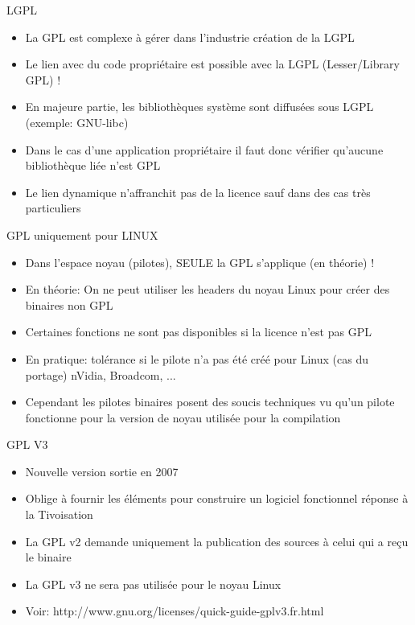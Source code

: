 \begin{frame}{LGPL}{}
  \begin{itemize}
  \item La GPL est complexe à gérer dans l'industrie \MVRightarrow{} création de la LGPL
  \item Le lien avec du code propriétaire est possible avec la LGPL (Lesser/Library GPL) !
  \item En majeure partie, les bibliothèques système sont diffusées sous LGPL (exemple: GNU-libc)
  \item Dans le cas d'une application propriétaire il faut donc vérifier qu'aucune bibliothèque liée n'est GPL
  \item Le lien dynamique n'affranchit pas de la licence sauf dans des cas très particuliers
  \end{itemize}
\end{frame}

\begin{frame}{GPL uniquement pour LINUX}{}
  \begin{itemize}
  \item Dans l'espace noyau (pilotes), SEULE la GPL s'applique (en théorie) !
  \item En théorie: On ne peut utiliser les headers du noyau Linux pour créer des binaires non GPL
  \item Certaines fonctions ne sont pas disponibles si la licence n'est pas GPL
  \item En pratique: tolérance si le pilote n'a pas été créé pour Linux (cas du portage) \MVRightarrow{} nVidia, Broadcom, ...
  \item Cependant les pilotes binaires posent des soucis techniques vu qu'un pilote fonctionne pour la version de noyau utilisée pour la compilation
  \end{itemize}
\end{frame}

\begin{frame}{GPL V3}{}
  \begin{itemize}
  \item Nouvelle version sortie en 2007
  \item Oblige à fournir les éléments pour construire un logiciel fonctionnel \MVRightarrow{} réponse à la Tivoisation
  \item La GPL v2 demande uniquement la publication des sources à celui qui a reçu le binaire
  \item La GPL v3 ne sera pas utilisée pour le noyau Linux
  \item Voir: http://www.gnu.org/licenses/quick-guide-gplv3.fr.html
  \end{itemize}
\end{frame}

